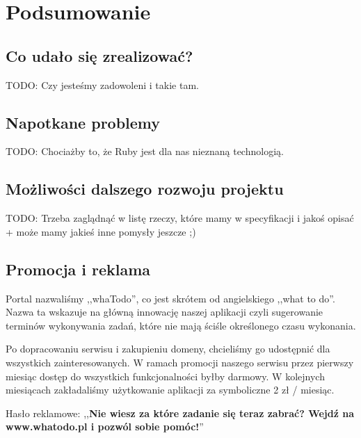 \documentclass[pdflatex,11pt]{aghdpl}
\begin{document}
\chapter{Podsumowanie}

\section{Co udało się zrealizować?}

TODO: Czy jesteśmy zadowoleni i takie tam.

\section{Napotkane problemy}

TODO: Chociażby to, że Ruby jest dla nas nieznaną technologią.

\section{Możliwości dalszego rozwoju projektu}

TODO: Trzeba zaglądnąć w listę rzeczy, które mamy w specyfikacji i jakoś opisać + może mamy jakieś inne pomysły jeszcze ;)

\section{Promocja i reklama}

Portal nazwaliśmy ,,whaTodo'', co jest skrótem od angielskiego ,,what to do''. Nazwa ta wskazuje na główną innowację naszej aplikacji czyli sugerowanie terminów wykonywania zadań, które nie mają ściśle określonego czasu wykonania.

Po dopracowaniu serwisu i zakupieniu domeny, chcieliśmy go udostępnić dla wszystkich zainteresowanych. W ramach promocji naszego serwisu przez pierwszy miesiąc dostęp do wszystkich funkcjonalności byłby darmowy. W kolejnych miesiącach zakładaliśmy użytkowanie aplikacji za symboliczne 2 zł / miesiąc.

Hasło reklamowe: ,,\textbf{Nie wiesz za które zadanie się teraz zabrać? Wejdź na www.whatodo.pl i pozwól sobie
pomóc!}''
\end{document}
